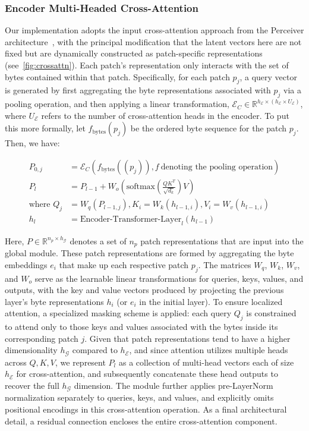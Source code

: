 \subsubsection{Encoder Multi-Headed Cross-Attention}
\label{sec:enc-cross-attn}
Our implementation adopts the input cross-attention approach from the Perceiver architecture~\citep{jaegle2021perceiver}, with the principal modification that the latent vectors here are not fixed but are dynamically constructed as patch-specific representations (see~\autoref{fig:crossattn}). Each patch's representation only interacts with the set of bytes contained within that patch. Specifically, for each patch $p_j$, a query vector is generated by first aggregating the byte representations associated with $p_j$ via a pooling operation, and then applying a linear transformation, $\mathcal{E}_{C} \in \mathbb{R}^{h_{\mathcal{E}} \times (h_{\mathcal{E}} \times U_{\mathcal{E}})}$, where $U_{\mathcal{E}}$ refers to the number of cross-attention heads in the encoder. To put this more formally, let $f_{\text{bytes}}(p_j)$ be the ordered byte sequence for the patch $p_j$. Then, we have:

\begin{align}
P_{0,j} &= \mathcal{E}_{C}(f_\text{bytes}((p_j)), f~ \text{denoting the pooling operation}) \\
P_l &= P_{l-1} + W_o\left(\text{softmax}\left(\frac{QK^T}{\sqrt{d_k}}\right)V\right) \\
\text{where } Q_j &= W_q(P_{l-1,j}), K_i = W_k(h_{l-1,i}), V_i = W_v(h_{l-1,i}) \\
h_l &= \text{Encoder-Transformer-Layer}_l(h_{l-1})
\end{align}

Here, $P \in \mathbb{R}^{n_p \times h_{\mathcal{G}}}$ denotes a set of $n_p$ patch representations that are input into the global module. These patch representations are formed by aggregating the byte embeddings $e_i$ that make up each respective patch $p_j$. The matrices $W_q$, $W_k$, $W_v$, and $W_o$ serve as the learnable linear transformations for queries, keys, values, and outputs, with the key and value vectors produced by projecting the previous layer’s byte representations $h_i$ (or $e_i$ in the initial layer). To ensure localized attention, a specialized masking scheme is applied: each query $Q_j$ is constrained to attend only to those keys and values associated with the bytes inside its corresponding patch $j$. Given that patch representations tend to have a higher dimensionality $h_{\mathcal{G}}$ compared to $h_{\mathcal{E}}$, and since attention utilizes multiple heads across $Q, K, V$, we represent $P_l$ as a collection of multi-head vectors each of size $h_{\mathcal{E}}$ for cross-attention, and subsequently concatenate these head outputs to recover the full $h_{\mathcal{G}}$ dimension. The module further applies pre-LayerNorm normalization separately to queries, keys, and values, and explicitly omits positional encodings in this cross-attention operation. As a final architectural detail, a residual connection encloses the entire cross-attention component.


